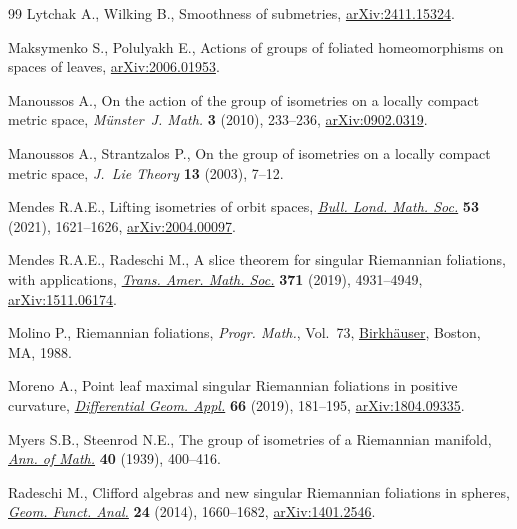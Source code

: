 \begin{thebibliography}{99}
Lytchak A., Wilking B., Smoothness of submetries,
 \href{http://arxiv.org/abs/2411.15324}{arXiv:2411.15324}.

Maksymenko S., Polulyakh E., Actions of groups of foliated homeomorphisms on spaces of leaves,
 \href{http://arxiv.org/abs/2006.01953}{arXiv:2006.01953}.

Manoussos A., On the action of the group of isometries on a locally compact
 metric space, \textit{M\"unster~J. Math.} \textbf{3} (2010), 233--236,
 \href{http://arxiv.org/abs/0902.0319}{arXiv:0902.0319}.

Manoussos A., Strantzalos P., On the group of isometries on a locally compact
 metric space, \textit{J.~Lie Theory} \textbf{13} (2003), 7--12.

Mendes R.A.E., Lifting isometries of orbit spaces,
 \href{https://doi.org/10.1112/blms.12514}{\textit{Bull. Lond. Math. Soc.}}
 \textbf{53} (2021), 1621--1626,
 \href{http://arxiv.org/abs/2004.00097}{arXiv:2004.00097}.

Mendes R.A.E., Radeschi M., A slice theorem for singular {R}iemannian
 foliations, with applications,
 \href{https://doi.org/10.1090/tran/7502}{\textit{Trans. Amer. Math. Soc.}}
 \textbf{371} (2019), 4931--4949,
 \href{http://arxiv.org/abs/1511.06174}{arXiv:1511.06174}.

Molino P., Riemannian foliations, \textit{Progr. Math.}, Vol.~73,
 \href{https://doi.org/10.1007/978-1-4684-8670-4}{Birkh\"auser}, Boston, MA,
 1988.

Moreno A., Point leaf maximal singular {R}iemannian foliations in positive
 curvature,
 \href{https://doi.org/10.1016/j.difgeo.2019.06.001}{\textit{Differential
 Geom. Appl.}} \textbf{66} (2019), 181--195,
 \href{http://arxiv.org/abs/1804.09335}{arXiv:1804.09335}.

Myers S.B., Steenrod N.E., The group of isometries of a {R}iemannian manifold,
 \href{https://doi.org/10.2307/1968928}{\textit{Ann. of Math.}} \textbf{40}
 (1939), 400--416.

Radeschi M., Clifford algebras and new singular {R}iemannian foliations in
 spheres, \href{https://doi.org/10.1007/s00039-014-0304-5}{\textit{Geom.
 Funct. Anal.}} \textbf{24} (2014), 1660--1682,
 \href{http://arxiv.org/abs/1401.2546}{arXiv:1401.2546}.


\end{thebibliography}
